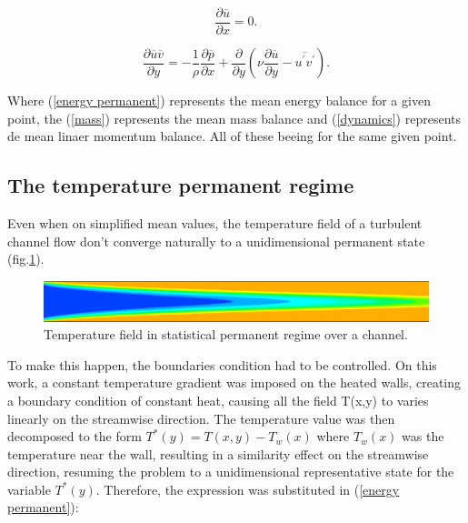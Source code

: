 \documentclass[10pt]{article} %
\begin{document}
\begin{equation}\label{mass}
\frac{\partial \overline{u}}{\partial x} = 0.
\end{equation}

\begin{equation}\label{dynamics}
\frac{\partial \overline{u}\overline{v}}{\partial y} = 
- \frac{1}{\rho} \frac{\partial \overline{p}}{\partial x} + \frac{\partial}{\partial y}\left(\nu \frac{\partial \overline{u}}{\partial y} - \overline{u^\prime v^\prime}\right).
\end{equation}

Where (\ref{energy permanent}) represents the mean energy balance for a given point, the (\ref{mass}) represents the mean mass balance and (\ref{dynamics}) represents de mean linaer momentum balance. All of these beeing for the same given point.

\subsection{The temperature permanent regime}

Even when on simplified mean values, the temperature field of a turbulent channel flow don't converge naturally to a unidimensional permanent state (fig.\ref{figure.2}).

\begin{figure}[h!]
	\centering
	\includegraphics[angle=0, scale=0.40]{temperatura}
	\caption{Temperature field in statistical permanent regime over a channel.}
	\label{figure.2}
\end{figure}
 
 To make this happen, the boundaries condition had to be controlled. On this work, a constant temperature gradient was imposed on the heated walls, creating a boundary condition of constant heat, causing all the field T(x,y) to varies linearly on the streamwise direction. The temperature value was then decomposed to the form $ T^\ast(y) = T(x,y) - T_w(x) $ where $T_w(x)$ was the temperature near the wall, resulting in a similarity effect on the streamwise direction, resuming the problem to a unidimensional representative state for the variable $T^\ast(y)$. Therefore, the expression was substituted in (\ref{energy permanent}):
\end{document}
